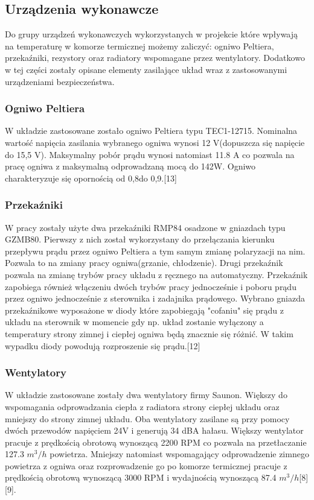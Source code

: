\documentclass[oneside]{mgr}
\begin{document}
\subsection{Urządzenia wykonawcze}

Do grupy urządzeń wykonawczych wykorzystanych w projekcie które wpływają na temperaturę w komorze termicznej możemy zaliczyć: ogniwo Peltiera, przekaźniki, rezystory oraz radiatory wspomagane przez wentylatory. Dodatkowo w tej części zostały opisane elementy zasilające układ wraz z zastosowanymi urządzeniami bezpieczeństwa.
\subsubsection{Ogniwo Peltiera}
W układzie zastosowane zostało ogniwo Peltiera typu TEC1-12715. Nominalna wartość napięcia zasilania wybranego ogniwa wynosi 12 V(dopuszcza się napięcie do 15,5 V). Maksymalny pobór prądu wynosi natomiast 11.8 A co pozwala na pracę ogniwa z maksymalną odprowadzaną mocą do 142W. Ogniwo charakteryzuje się opornością od 0,8\ohm do 0,9\ohm.[13]
\subsubsection{Przekaźniki}
W pracy zostały użyte dwa przekaźniki RMP84 osadzone w gniazdach typu GZMB80. Pierwszy z nich został wykorzystany do przełączania kierunku przepływu prądu przez ogniwo Peltiera a tym samym zmianę polaryzacji na nim. Pozwala to na zmiany pracy ogniwa(grzanie, chłodzenie). Drugi przekaźnik pozwala na zmianę trybów pracy układu z ręcznego na automatyczny. Przekaźnik zapobiega również włączeniu dwóch trybów pracy jednocześnie i poboru prądu przez ogniwo jednocześnie z sterownika i zadajnika prądowego. Wybrano gniazda przekaźnikowe wyposażone w diody które zapobiegają "cofaniu" się prądu z układu na sterownik w momencie gdy np. układ zostanie wyłączony a temperatury strony zimnej i ciepłej ogniwa będą znacznie się różnić. W takim wypadku diody powodują rozproszenie się prądu.[12]
\subsubsection{Wentylatory}
W układzie zastosowane zostały dwa wentylatory firmy Saunon. Większy do wspomagania odprowadzania ciepła z radiatora strony ciepłej układu oraz mniejszy do strony zimnej układu. Oba wentylatory zasilane są przy pomocy dwóch przewodów napięciem 24V i generują 34 dBA hałasu. Większy wentylator pracuje z prędkością obrotową wynoszącą 2200 RPM co pozwala na przetłaczanie 127.3 $m^3/h$ powietrza. Mniejszy natomiast wspomagający odprowadzenie zimnego powietrza z ogniwa oraz rozprowadzenie go po komorze termicznej pracuje z prędkością obrotową wynoszącą 3000 RPM i wydajnością wynoszącą 87.4 $m^3/h$[8][9].
\end{document}
